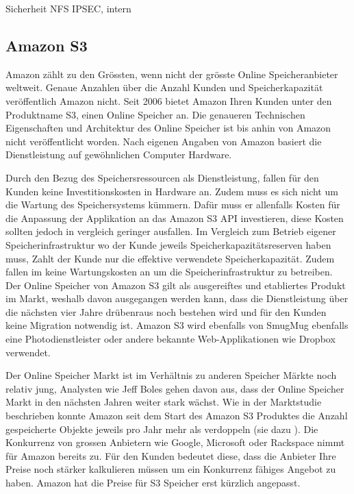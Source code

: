 Sicherheit NFS IPSEC, intern

\subsection{Amazon S3}
Amazon zählt zu den Grössten, wenn nicht der grösste Online Speicheranbieter weltweit. Genaue Anzahlen über die Anzahl Kunden und Speicherkapazität veröffentlich Amazon nicht. Seit 2006 bietet Amazon Ihren Kunden unter den Produktname S3, einen Online Speicher an. Die genaueren Technischen Eigenschaften und Architektur des Online Speicher ist bis anhin von Amazon nicht veröffentlicht worden. Nach eigenen Angaben von Amazon basiert die Dienstleistung auf gewöhnlichen Computer Hardware.

Durch den Bezug des Speichersressourcen als Dienstleistung, fallen für den Kunden keine Investitionskosten in Hardware an. Zudem muss es sich nicht um die Wartung des Speichersystems kümmern. Dafür muss er allenfalls Kosten für die Anpassung der Applikation an das Amazon S3 API investieren, diese Kosten sollten jedoch in vergleich geringer ausfallen. Im Vergleich zum Betrieb eigener Speicherinfrastruktur wo der Kunde jeweils Speicherkapazitätsreserven haben muss, Zahlt der Kunde nur die effektive verwendete Speicherkapazität. Zudem fallen im keine Wartungskosten an um die Speicherinfrastruktur zu betreiben. Der Online Speicher von Amazon S3 gilt als ausgereiftes und etabliertes Produkt im Markt, weshalb davon ausgegangen werden kann, dass die Dienstleistung über die nächsten vier Jahre drübenraus noch bestehen wird und für den Kunden keine Migration notwendig ist. Amazon S3 wird ebenfalls von SmugMug ebenfalls eine Photodienstleister oder andere bekannte Web-Applikationen wie Dropbox verwendet.\cite{SmugMug}\cite{Dropbox2011}

Der Online Speicher Markt ist im Verhältnis zu anderen Speicher Märkte noch relativ jung, Analysten wie Jeff Boles gehen davon aus, dass der Online Speicher Markt in den nächsten Jahren weiter stark wächst. Wie in der Marktstudie beschrieben konnte Amazon seit dem Start des Amazon S3 Produktes die Anzahl gespeicherte Objekte jeweils pro Jahr mehr als verdoppeln (sie dazu ). Die Konkurrenz von grossen Anbietern wie Google, Microsoft oder Rackspace nimmt für Amazon bereits zu. Für den Kunden bedeutet diese, dass die Anbieter Ihre Preise noch stärker kalkulieren müssen um ein Konkurrenz fähiges Angebot zu haben. Amazon hat die Preise für S3 Speicher erst kürzlich angepasst.\cite{Boles2011}\cite{Barr2012a}

